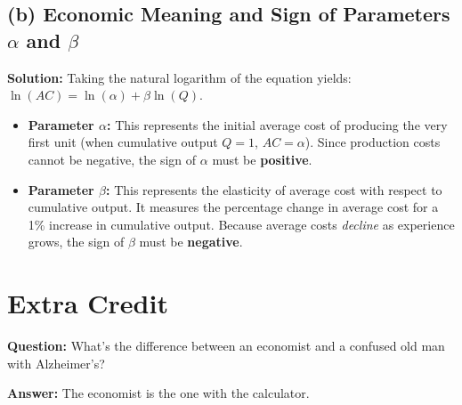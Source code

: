 \documentclass[11pt, letterpaper]{article}
\begin{document}
\subsection*{(b) Economic Meaning and Sign of Parameters $\alpha$ and $\beta$}
\noindent \textbf{Solution:}
Taking the natural logarithm of the equation yields: $\ln(AC) = \ln(\alpha) + \beta \ln(Q)$.
\begin{itemize}
  \item \textbf{Parameter $\alpha$:} This represents the initial average cost of producing the very first unit (when cumulative output $Q = 1$, $AC = \alpha$). Since production costs cannot be negative, the sign of $\alpha$ must be \textbf{positive}.
  \item \textbf{Parameter $\beta$:} This represents the elasticity of average cost with respect to cumulative output. It measures the percentage change in average cost for a 1\% increase in cumulative output. Because average costs \textit{decline} as experience grows, the sign of $\beta$ must be \textbf{negative}.
\end{itemize}

\vspace{1em}
\section*{Extra Credit}

\textbf{Question:} What's the difference between an economist and a confused old man with Alzheimer's?

\noindent \textbf{Answer:}
The economist is the one with the calculator.
\end{document}
